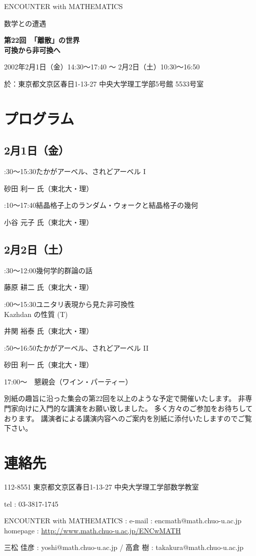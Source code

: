 \documentclass[uplatex,dvipdfmx]{jlreq}
\newcommand{\talk}[3]{%
\noindent
#1\quad #2\par
\hspace*{2em}#3\par\smallskip
}
\newcommand{\EwMnumber}{第22回}
\newcommand{\EwMtitle}{「離散」の世界\\[2mm]\large 可換から非可換へ}
\newcommand{\EwMdate}{2002年2月1日（金）14:30～17:40 ～ 2月2日（土）10:30～16:50}
\newcommand{\EwMplace}{東京都文京区春日1-13-27 中央大学理工学部5号館 5533号室}
\newcommand{\EwMtitleblock}{

\vspace*{-5mm}

\begin{center}

{\Large ENCOUNTER with MATHEMATICS}

\vspace{2mm}

{\large 数学との遭遇}

\vspace{4mm}

{\Large \bfseries \EwMnumber\ \EwMtitle}

\vspace{4mm}

\EwMdate

\vspace{2mm}

於：\EwMplace

\end{center}

\vspace{2mm}

}
\begin{document}
\EwMtitleblock


\section*{プログラム}

\subsection*{2月1日（金）}

\talk
{14:30～15:30}
{たかがアーベル、されどアーベル I}
{砂田 利一 氏（東北大・理）}

\talk
{16:10～17:40}
{結晶格子上のランダム・ウォークと結晶格子の幾何}
{小谷 元子 氏（東北大・理）}

\subsection*{2月2日（土）}

\talk
{10:30～12:00}
{幾何学的群論の話}
{藤原 耕二 氏（東北大・理）}

\talk
{14:00～15:30}
{ユニタリ表現から見た非可換性\\[1mm]Kazhdan の性質 (T)}
{井関 裕泰 氏（東北大・理）}

\talk
{15:50～16:50}
{たかがアーベル、されどアーベル II}
{砂田 利一 氏（東北大・理）}

\bigskip

17:00～　懇親会（ワイン・パーティー）


\bigskip

別紙の趣旨に沿った集会の第22回を以上のような予定で開催いたします。  
非専門家向けに入門的な講演をお願い致しました。  
多く方々のご参加をお待ちしております。  
講演者による講演内容へのご案内を別紙に添付いたしますのでご覧下さい。


\section*{連絡先}

112-8551 東京都文京区春日1-13-27 中央大学理工学部数学教室 

tel : 03-3817-1745  

ENCOUNTER with MATHEMATICS : e-mail : encmath@math.chuo-u.ac.jp  
homepage : \url{http://www.math.chuo-u.ac.jp/ENCwMATH}  

三松 佳彦 : yoshi@math.chuo-u.ac.jp / 高倉 樹 : takakura@math.chuo-u.ac.jp
\end{document}
